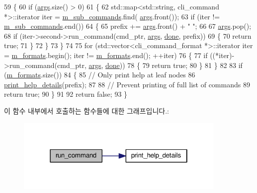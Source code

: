 \begin{DoxyCode}
59 \{
60     \textcolor{keywordflow}{if} (\hyperlink{namespaceastime__fitline_a8187411843a6284ffb964ef3fb9fcab3}{args}.size() > 0)
61     \{
62         std::map<std::string, cli\_command *>::iterator iter = \hyperlink{classcli__command_a5a62acea342a09bb5de738b81f3243b5}{m\_sub\_commands}.find(
      \hyperlink{namespaceastime__fitline_a8187411843a6284ffb964ef3fb9fcab3}{args}.front());
63         \textcolor{keywordflow}{if} (iter != \hyperlink{classcli__command_a5a62acea342a09bb5de738b81f3243b5}{m\_sub\_commands}.end())
64         \{
65             prefix += \hyperlink{namespaceastime__fitline_a8187411843a6284ffb964ef3fb9fcab3}{args}.front() + \textcolor{stringliteral}{" "};
66 
67             \hyperlink{namespaceastime__fitline_a8187411843a6284ffb964ef3fb9fcab3}{args}.pop();
68             \textcolor{keywordflow}{if} (iter->second->run\_command(cmd\_ptr, \hyperlink{namespaceastime__fitline_a8187411843a6284ffb964ef3fb9fcab3}{args}, \hyperlink{mrp_validate_8c_a5992b274cfdcacdbc1fa8347fd01ebde}{done}, prefix))
69             \{
70                 \textcolor{keywordflow}{return} \textcolor{keyword}{true};
71             \}
72         \}
73     \}
74 
75     \textcolor{keywordflow}{for} (std::vector<cli\_command\_format *>::iterator iter = \hyperlink{classcli__command_a08886759ebf01d26ba123d7cdaa4df16}{m\_formats}.begin(); iter != 
      \hyperlink{classcli__command_a08886759ebf01d26ba123d7cdaa4df16}{m\_formats}.end(); ++iter)
76     \{
77         \textcolor{keywordflow}{if} ((*iter)->run\_command(cmd\_ptr, \hyperlink{namespaceastime__fitline_a8187411843a6284ffb964ef3fb9fcab3}{args}, \hyperlink{mrp_validate_8c_a5992b274cfdcacdbc1fa8347fd01ebde}{done}))
78         \{
79             \textcolor{keywordflow}{return} \textcolor{keyword}{true};
80         \}
81     \}
82 
83     \textcolor{keywordflow}{if} (\hyperlink{classcli__command_a08886759ebf01d26ba123d7cdaa4df16}{m\_formats}.size())
84     \{
85         \textcolor{comment}{// Only print help at leaf nodes}
86         \hyperlink{classcli__command_a5fcdb7a311d37dce9894c82d557ee5e6}{print\_help\_details}(prefix);
87 
88         \textcolor{comment}{// Prevent printing of full list of commands}
89         \textcolor{keywordflow}{return} \textcolor{keyword}{true};
90     \}
91 
92     \textcolor{keywordflow}{return} \textcolor{keyword}{false};
93 \}
\end{DoxyCode}


이 함수 내부에서 호출하는 함수들에 대한 그래프입니다.\+:
\nopagebreak
\begin{figure}[H]
\begin{center}
\leavevmode
\includegraphics[width=286pt]{classcli__command_a8bd8ac0f5b50e8083f020aa0a88fba85_cgraph}
\end{center}
\end{figure}




